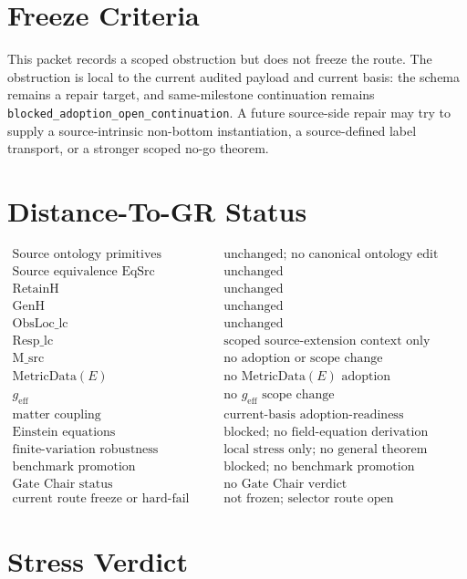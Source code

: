 \documentclass[11pt]{article}
\newcommand{\MetricData}{\mathrm{MetricData}}
\newcommand{\geff}{g_{\mathrm{eff}}}
\begin{document}
\section{Freeze Criteria}

This packet records a scoped obstruction but does not freeze the route.
The obstruction is local to the current audited payload and current basis:
the schema remains a repair target, and same-milestone continuation remains
\texttt{blocked\_adoption\_open\_continuation}. A future source-side repair
may try to supply a source-intrinsic non-bottom instantiation, a source-defined
label transport, or a stronger scoped no-go theorem.

\section{Distance-To-GR Status}

\[
\begin{array}{ll}
\text{Source ontology primitives} & \text{unchanged; no canonical ontology edit}\\
\text{Source equivalence EqSrc} & \text{unchanged}\\
\text{RetainH} & \text{unchanged}\\
\text{GenH} & \text{unchanged}\\
\text{ObsLoc\_lc} & \text{unchanged}\\
\text{Resp\_lc} & \text{scoped source-extension context only}\\
\text{M\_src} & \text{no adoption or scope change}\\
\text{\(\MetricData(E)\)} & \text{no \(\MetricData(E)\) adoption}\\
\text{\(\geff\)} & \text{no \(\geff\) scope change}\\
\text{matter coupling} & \text{current-basis adoption-readiness obstruction}\\
\text{Einstein equations} & \text{blocked; no field-equation derivation}\\
\text{finite-variation robustness} & \text{local stress only; no general theorem}\\
\text{benchmark promotion} & \text{blocked; no benchmark promotion}\\
\text{Gate Chair status} & \text{no Gate Chair verdict}\\
\text{current route freeze or hard-fail status} & \text{not frozen; selector route open}
\end{array}
\]

\section{Stress Verdict}
\end{document}
